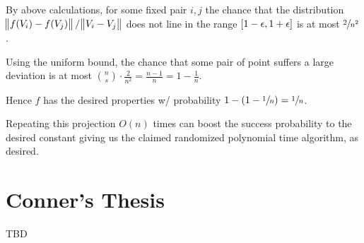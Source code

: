 \documentclass{article}
\DeclareMathOperator{\trace}{tr}
\begin{document}
By above  calculations, for some fixed pair \(i, j\) the chance that the distribution
\(\norm{f(V_i) - f(V_j)}/ \norm{V_i - V_j}\) does not line in the range \(\intcc{1 - \epsilon, 1 + \epsilon}\) is at most \(\sfrac{2}{n^2}\).

Using the uniform bound, the chance that some pair of point suffers a large deviation is at most \(\binom{n}{s} \cdot \frac{2}{n^2} = \frac{n-1}{n} = 1-\frac{1}{n}\).

Hence \(f\) has the desired properties w/ probability \(1 - (1 - \sfrac{1}{n}) = \sfrac{1}{n}\).

Repeating this projection \(O(n)\) times can boost the success probability to the desired constant giving us the claimed randomized polynomial time algorithm, as desired.

\section{Conner's Thesis}

TBD


\end{document}
